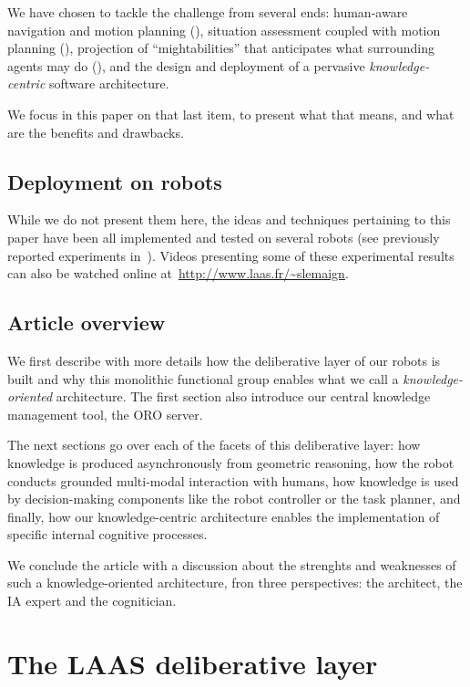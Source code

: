 \documentclass[letterpaper, 10 pt, conference]{ieeeconf}  %
\begin{document}
We have chosen to tackle the challenge from several ends: human-aware
navigation and motion planning (\cite{...Mamoun}), situation assessment coupled
with motion planning (\cite{...}), projection of ``mightabilities'' that
anticipates what surrounding agents may do (\cite{Amit...}), and the design and
deployment of a pervasive \emph{knowledge-centric} software architecture.

We focus in this paper on that last item, to present what that means, and what
are the benefits and drawbacks.

\subsection{Deployment on robots}

While we do not present them here, the ideas and techniques pertaining to this
paper have been all implemented and tested on several robots (see previously
reported experiments in~\cite{Lemaignan2010, Ros2010b, Lemaignan2011a,
Warnier2012a}). Videos presenting some of these experimental results can also
be watched online at~\url{http://www.laas.fr/~slemaign}.

\subsection{Article overview}

We first describe with more details how the deliberative layer of our robots is
built and why this monolithic functional group enables what we call a
\emph{knowledge-oriented} architecture. The first section also introduce our
central knowledge management tool, the ORO server.

The next sections go over each of the facets of this deliberative layer: how
knowledge is produced asynchronously from geometric reasoning, how the robot
conducts grounded multi-modal interaction with humans, how knowledge is used by
decision-making components like the robot controller or the task planner, and
finally, how our knowledge-centric architecture enables the implementation of
specific internal cognitive processes.

We conclude the article with a discussion about the strenghts and weaknesses of
such a knowledge-oriented architecture, fron three perspectives: the architect,
the IA expert and the cognitician.


\section{The LAAS deliberative layer}
\end{document}

